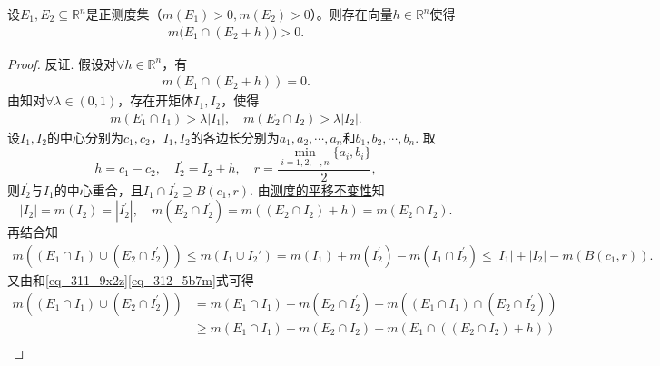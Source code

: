 \documentclass[../../main.tex]{subfiles}%
\begin{document}
\begin{proposition}
设$E_1,E_2\subseteq \mathbb{R}^n$是正测度集（$m(E_1)>0,m(E_2)>0$）。则存在向量$h\in \mathbb{R}^n$使得
\begin{align*}
m\bigl(E_1\cap (E_2+h)\bigr) > 0.
\end{align*}
\end{proposition}
\begin{proof}
反证. 假设对$\forall h\in \mathbb{R}^n$，有
\begin{align}\label{eq_311_9x2z}
m\left( E_1\cap \left( E_2+h \right) \right) =0.
\end{align}
由知对$\forall \lambda \in \left( 0,1 \right)$，存在开矩体$I_1,I_2$，使得
\begin{align}\label{eq_312_5b7m}
m\left( E_1\cap I_1 \right) >\lambda \left| I_1 \right|,\quad m\left( E_2\cap I_2 \right) >\lambda \left| I_2 \right|.
\end{align}
设$I_1,I_2$的中心分别为$c_1,c_2$，$I_1,I_2$的各边长分别为$a_1,a_2,\cdots ,a_n$和$b_1,b_2,\cdots ,b_n$. 取
$$h=c_1-c_2,\quad I_{2}^{\prime}=I_2+h,\quad r=\frac{\min\limits_{i=1,2,\cdots ,n}\{a_i,b_i\}}{2},$$
则$I_{2}^{\prime}$与$I_1$的中心重合，且$I_1\cap I_{2}^{\prime}\supseteq B\left( c_1,r \right)$. 由\hyperref[theorem:外测度的平移不变性]{测度的平移不变性}知
$$\left| I_2 \right|=m\left( I_2 \right) =\left| I_{2}^{\prime} \right|,\quad m\left( E_2\cap I_{2}^{\prime} \right) =m\left( \left( E_2\cap I_2 \right) +h \right) =m\left( E_2\cap I_2 \right).$$
再结合知
\begin{align}\label{eq_313_4d8s}
m\left( \left( E_1\cap I_1 \right) \cup \left( E_2\cap I_{2}^{\prime} \right) \right)
\leqslant m\left( I_1\cup I_2' \right)
= m\left( I_1 \right) +m\left( I_{2}^{\prime} \right) -m\left( I_1\cap I_{2}^{\prime} \right)
\leqslant \left| I_1 \right|+\left| I_2 \right|-m\left( B\left( c_1,r \right) \right).
\end{align}
又由和\eqref{eq_311_9x2z}\eqref{eq_312_5b7m}式可得
\begin{align}\label{eq_314_6f9g}
m\left( \left( E_1\cap I_1 \right) \cup \left( E_2\cap I_{2}^{\prime} \right) \right)
&= m\left( E_1\cap I_1 \right) +m\left( E_2\cap I_{2}^{\prime} \right) -m\left( \left( E_1\cap I_1 \right) \cap \left( E_2\cap I_{2}^{\prime} \right) \right) \nonumber\\
&\geqslant m\left( E_1\cap I_1 \right) +m\left( E_2\cap I_2 \right) -m\left( E_1\cap \left( \left( E_2\cap I_2 \right) +h \right) \right) \nonumber\\

\end{align}
\end{proof}
\end{document}
